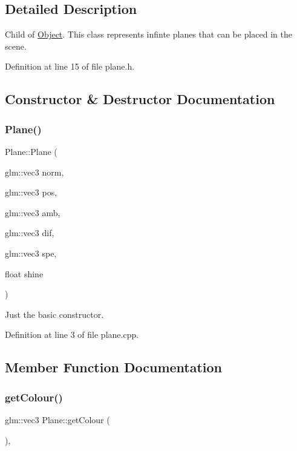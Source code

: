 \subsection{Detailed Description}
Child of \mbox{\hyperlink{class_object}{Object}}. This class represents infinte planes that can be placed in the scene. 

Definition at line 15 of file plane.\+h.



\subsection{Constructor \& Destructor Documentation}
\mbox{\label{class_plane_a7aef2d9e06892562f982d9fd6596370c}} 
\subsubsection{\texorpdfstring{Plane()}{Plane()}}
{\footnotesize\ttfamily Plane\+::\+Plane (\begin{DoxyParamCaption}\item[{glm\+::vec3}]{norm,  }\item[{glm\+::vec3}]{pos,  }\item[{glm\+::vec3}]{amb,  }\item[{glm\+::vec3}]{dif,  }\item[{glm\+::vec3}]{spe,  }\item[{float}]{shine }\end{DoxyParamCaption})}



Just the basic constructor. 



Definition at line 3 of file plane.\+cpp.



\subsection{Member Function Documentation}
\mbox{\label{class_plane_a81494e203b2cd4bf67d00c2503e1929f}} 
\subsubsection{\texorpdfstring{get\+Colour()}{getColour()}\hspace{0.1cm}{\footnotesize\ttfamily [1/2]}}
{\footnotesize\ttfamily glm\+::vec3 Plane\+::get\+Colour (\begin{DoxyParamCaption}{ }\end{DoxyParamCaption})\hspace{0.3cm}{\ttfamily [override]}, {\ttfamily [virtual]}}



